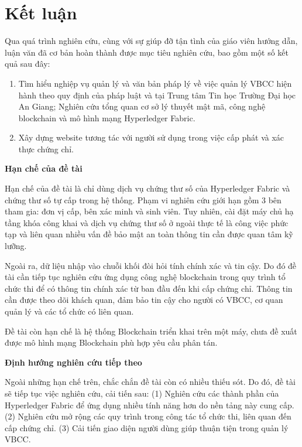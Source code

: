 \chapter{Kết luận}
Qua quá trình nghiên cứu, cùng với sự giúp đỡ tận tình của giáo viên hướng dẫn, luận văn đã cơ bản hoàn thành được mục tiêu nghiên cứu, bao gồm một số kết quả sau đây:

\begin{enumerate}

\item Tìm hiểu nghiệp vụ quản lý và văn bản pháp lý về việc quản lý VBCC hiện hành theo quy định của pháp luật và tại Trung tâm Tin học Trường Đại học An Giang; Nghiên cứu tổng quan cơ sở lý thuyết mật mã, công nghệ blockchain và mô hình mạng Hyperledger Fabric.

\item Xây dựng website tương tác với người sử dụng trong việc cấp phát và xác thực chứng chỉ.

\end{enumerate}

\textbf{Hạn chế của đề tài}

Hạn chế của đề tài là chỉ dùng dịch vụ chứng thư số của Hyperledger Fabric và chứng thư số tự cấp trong hệ thống. Phạm vi nghiên cứu giới hạn gồm 3 bên tham gia: đơn vị cấp, bên xác minh và sinh viên. Tuy nhiên, cài đặt máy chủ hạ tầng khóa công khai và dịch vụ chứng thư số ở ngoài thực tế là công việc phức tạp và liên quan nhiều vấn đề bảo mật an toàn thông tin cần được quan tâm kỹ lưỡng.

Ngoài ra, dữ liệu nhập vào chuỗi khối đòi hỏi tính chính xác và tin cậy. Do đó đề tài cần tiếp tục nghiên cứu ứng dụng công nghệ blockchain trong quy trình tổ chức thi để có thông tin chính xác từ ban đầu đến khi cấp chứng chỉ. Thông tin cần được theo dõi khách quan, đảm bảo tin cậy cho người có VBCC, cơ quan quản lý và các tổ chức có liên quan.

Đề tài còn hạn chế là hệ thống Blockchain triển khai trên một máy, chưa đề xuất được mô hình mạng Blockchain phù hợp yêu cầu phân tán. 

\textbf{Định hướng nghiên cứu tiếp theo}

Ngoài những hạn chế trên, chắc chắn đề tài còn có nhiều thiếu sót. Do đó, đề tài sẽ tiếp tục việc nghiên cứu, cải tiến sau: (1) Nghiên cứu các thành phần của Hyperledger Fabric để ứng dụng nhiều tính năng hơn do nền tảng này cung cấp. (2) Nghiên cứu mở rộng các quy trình trong công tác tổ chức thi, liên quan đến cấp chứng chỉ. (3) Cải tiến giao diện người dùng giúp thuận tiện trong quản lý VBCC.
